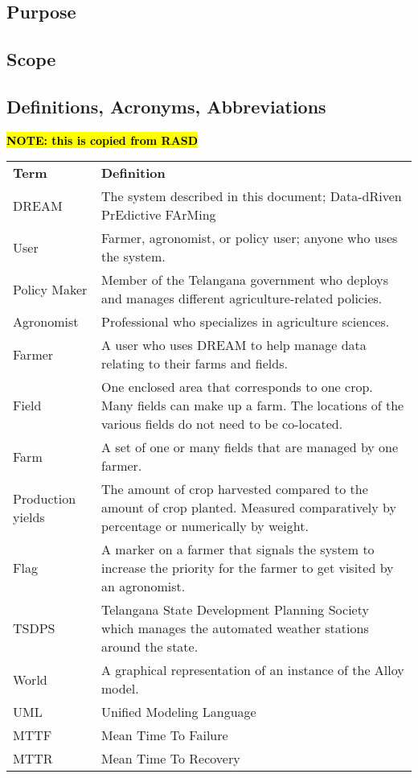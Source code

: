 \subsection{Purpose}
\begin{flushleft}

\end{flushleft}

\subsection{Scope}
\subsection{Definitions, Acronyms, Abbreviations}

\hl{\textbf{NOTE: this is copied from RASD}}
\begin{center}
\renewcommand{\arraystretch}{1.25}
\begin{tabular}{l >{\raggedright\arraybackslash}p{12cm} } \hline
    \textbf{Term} & \textbf{Definition}\\ 
    DREAM & The system described in this document; Data-dRiven PrEdictive FArMing\\
    User & Farmer, agronomist, or policy user; anyone who uses the system.\\
	Policy Maker & Member of the Telangana government who deploys and manages different agriculture-related policies. \\
	Agronomist & Professional who specializes in agriculture sciences. \\
    Farmer & A user who uses DREAM to help manage data relating to their farms and fields.\\
    Field & One enclosed area that corresponds to one crop. Many fields can make up a farm. The locations of the various fields do not need to be co-located.\\
    Farm & A set of one or many fields that are managed by one farmer.\\
    Production yields & The amount of crop harvested compared to the amount of crop planted. Measured comparatively by percentage or numerically by weight.\\
    Flag & A marker on a farmer that signals the system to increase the priority for the farmer to get visited by an agronomist.\\
    TSDPS & Telangana State Development Planning Society which manages the automated weather stations around the state. \\
    World & A graphical representation of an instance of the Alloy model.\\
    UML & Unified Modeling Language\\
    MTTF & Mean Time To Failure\\
    MTTR & Mean Time To Recovery\\
    \hline
\end{tabular}
\end{center}



